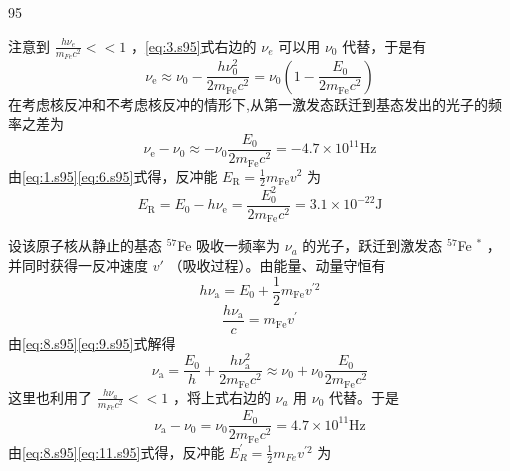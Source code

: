 \begin{solution}{95}
\begin{subsolution}
注意到 $\frac{h\nu_{e}}{m_{Fe}c^{2}}<<1$ ，\eqref{eq:3.s95}式右边的 $\nu_{e}$ 可以用 $\nu_{0}$ 代替，于是有
\begin{equation}
\nu_ {\mathrm{e}} \approx \nu_ {0} - \frac {h \nu_ {0} ^ {2}}{2 m _ {\mathrm{Fe}} c ^ {2}} = \nu_ {0} \left(1 - \frac {E _ {0}}{2 m _ {\mathrm{Fe}} c ^ {2}}\right)
\label{eq:5.s95}
\end{equation}
在考虑核反冲和不考虑核反冲的情形下,从第一激发态跃迁到基态发出的光子的频率之差为
\begin{equation}
\nu_ {\mathrm{e}} - \nu_ {0} \approx - \nu_ {0} \frac {E _ {0}}{2 m _ {\mathrm{Fe}} c ^ {2}} = - 4. 7 \times 1 0 ^ {1 1} \mathrm{Hz}
\label{eq:6.s95}
\end{equation}
由\eqref{eq:1.s95}\eqref{eq:6.s95}式得，反冲能 $E_{\mathrm{R}}=\frac{1}{2}m_{\mathrm{Fe}}v^{2}$ 为
\begin{equation}
E _ {\mathrm{R}} = E _ {0} - h \nu_ {\mathrm{e}} = \frac {E _ {0} ^ {2}}{2 m _ {\mathrm{Fe}} c ^ {2}} = 3. 1 \times 1 0 ^ {- 2 2} \mathrm{J}
\label{eq:7.s95}
\end{equation}
\end{subsolution}
\begin{subsolution}
设该原子核从静止的基态 $^{57}$Fe 吸收一频率为 $\nu_{a}$ 的光子，跃迁到激发态 $^{57}$Fe $^{*}$ ，并同时获得一反冲速度 $v'$ （吸收过程）。由能量、动量守恒有
\begin{equation}
h \nu_ {\mathrm{a}} = E _ {0} + \frac {1}{2} m _ {\mathrm{Fe}} v ^ {\prime 2}
\label{eq:8.s95}
\end{equation}
\begin{equation}
\frac {h \nu_ {\mathrm{a}}}{c} = m _ {\mathrm{Fe}} v ^ {\prime}
\label{eq:9.s95}
\end{equation}
由\eqref{eq:8.s95}\eqref{eq:9.s95}式解得
\begin{equation}
\nu_ {\mathrm{a}} = \frac {E _ {0}}{h} + \frac {h \nu_ {\mathrm{a}} ^ {2}}{2 m _ {\mathrm{Fe}} c ^ {2}} \approx \nu_ {0} + \nu_ {0} \frac {E _ {0}}{2 m _ {\mathrm{Fe}} c ^ {2}}
\label{eq:10.s95}
\end{equation}
这里也利用了 $\frac{h\nu_{a}}{m_{Fe}c^{2}}<<1$ ，将上式右边的 $\nu_{a}$ 用 $\nu_{0}$ 代替。于是
\begin{equation}
\nu_ {\mathrm{a}} - \nu_ {0} = \nu_ {0} \frac {E _ {0}}{2 m _ {\mathrm{Fe}} c ^ {2}} = 4. 7 \times 1 0 ^ {1 1} \mathrm{Hz}
\label{eq:11.s95}
\end{equation}
由\eqref{eq:8.s95}\eqref{eq:11.s95}式得，反冲能 $E_{R}^{\prime}=\frac{1}{2}m_{Fe}v^{\prime2}$ 为
\begin{equation}

\end{equation}
\end{subsolution}
\end{solution}
